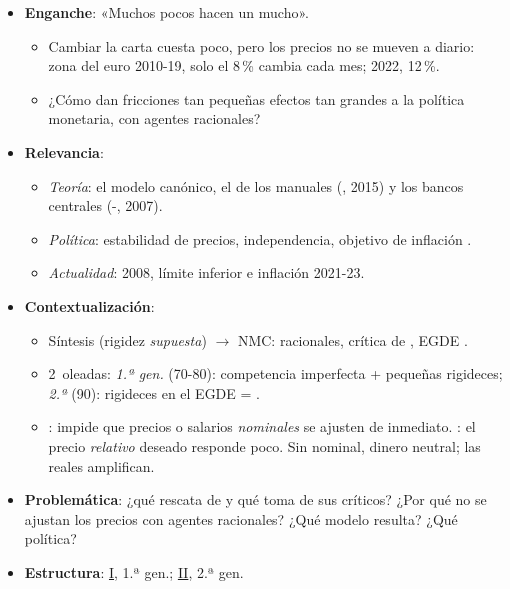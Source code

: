 \documentclass{article}
\begin{document}
\cabecerarepaso
\begin{columnas}

\begin{itemize}
\item \textbf{Enganche}: «Muchos pocos hacen un mucho».
  \begin{itemize}
  \item Cambiar la carta cuesta poco, pero los precios no se mueven a diario: zona del euro 2010-19, solo el 8\,\% cambia cada mes; 2022, 12\,\%.
  \item ¿Cómo dan fricciones tan pequeñas efectos tan grandes a la política monetaria, con agentes racionales?
  \end{itemize}
\item \textbf{Relevancia}:
  \begin{itemize}
  \item \emph{Teoría}: el modelo canónico, el de los manuales (, 2015) y los bancos centrales (-, 2007).
  \item \emph{Política}: estabilidad de precios, independencia, objetivo de inflación .
  \item \emph{Actualidad}: 2008, límite inferior e inflación 2021-23.
  \end{itemize}
\item \textbf{Contextualización}:
  \begin{itemize}
  \item Síntesis (rigidez \emph{supuesta})  $\to$ NMC: racionales, crítica de , EGDE .
  \item 2~oleadas: \emph{1.ª gen.} (70-80): competencia imperfecta + pequeñas rigideces; \emph{2.ª} (90): rigideces en el EGDE = .
  \item {}: impide que precios o salarios \emph{nominales} se ajusten de inmediato. : el precio \emph{relativo} deseado responde poco. Sin nominal, dinero neutral; las reales amplifican.
  \end{itemize}
\item \textbf{Problemática}: ¿qué rescata de  y qué toma de sus críticos? ¿Por qué no se ajustan los precios con agentes racionales? ¿Qué modelo resulta? ¿Qué política?
\item \textbf{Estructura}: \hyperref[rep:I]{I}, 1.ª gen.; \hyperref[rep:II]{II}, 2.ª gen.
\end{itemize}


\end{columnas}
\end{document}
